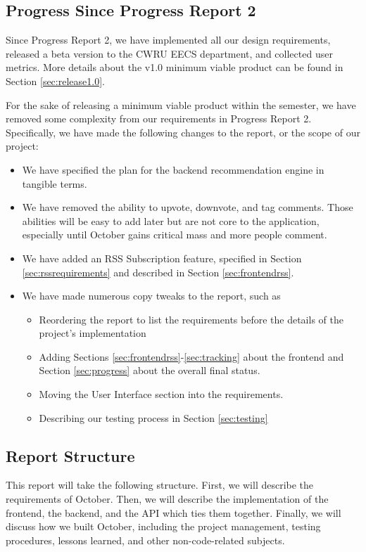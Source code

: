 \documentclass[11pt,letterpaper,titlepage]{article}
\begin{document}
\subsection{Progress Since Progress Report 2}
Since Progress Report 2, we have implemented all our design requirements, released a beta version to the CWRU EECS department, and collected user metrics. More details about the v1.0 minimum viable product can be found in Section \ref{sec:release1.0}.

For the sake of releasing a minimum viable product within the semester, we have removed some complexity from our requirements in Progress Report 2. Specifically, we have made the following changes to the report, or the scope of our project:

\begin{itemize}
\item We have specified the plan for the backend recommendation engine in tangible terms.
\item We have removed the ability to upvote, downvote, and tag comments. Those abilities will be easy to add later but are not core to the application, especially until October gains critical mass and more people comment.
\item We have added an RSS Subscription feature, specified in Section \ref{sec:rssrequirements} and described in Section \ref{sec:frontendrss}.
\item We have made numerous copy tweaks to the report, such as
  \begin{itemize}
  \item Reordering the report to list the requirements before the details of the project's implementation
  \item Adding Sections \ref{sec:frontendrss}-\ref{sec:tracking} about the frontend and Section \ref{sec:progress} about the overall final status.
  \item Moving the User Interface section into the requirements.
  \item Describing our testing process in Section \ref{sec:testing}
  \end{itemize}
\end{itemize}

\subsection{Report Structure}
This report will take the following structure. First, we will describe the requirements of October.
Then, we will describe the implementation of the frontend, the backend, and the API which ties them together.
Finally, we will discuss how we built October, including the project management, testing procedures, lessons learned, and other non-code-related subjects.
\end{document}
